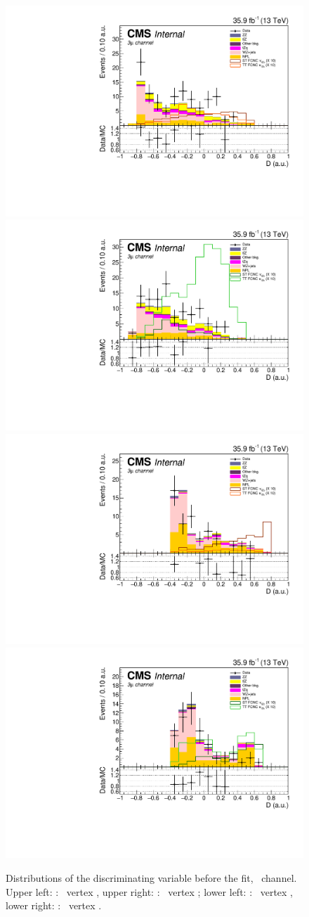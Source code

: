 \begin{figure}[ht]
	\centering
	\includegraphics[width=0.49\linewidth]{6_Search/Figures/BDTdistributions/toppair_Zut_BDT_uuu_Stack}
	\includegraphics[width=0.49\linewidth]{6_Search/Figures/BDTdistributions/toppair_Zct_BDT_uuu_Stack}
	\includegraphics[width=0.49\linewidth]{6_Search/Figures/BDTdistributions/singletop_Zut_BDT_uuu_Stack}
	\includegraphics[width=0.49\linewidth]{6_Search/Figures/BDTdistributions/singletop_Zct_BDT_uuu_Stack}
	\caption{Distributions of the discriminating variable before the fit, \mumumu\  channel. Upper left: \TTSR: \Zut\ vertex , upper right: \TTSR: \Zct\ vertex ; lower left: \STSR: \Zut\ vertex , lower right: \STSR: \Zct\ vertex .}
	\label{fig:bdtuuustack}
\end{figure}


